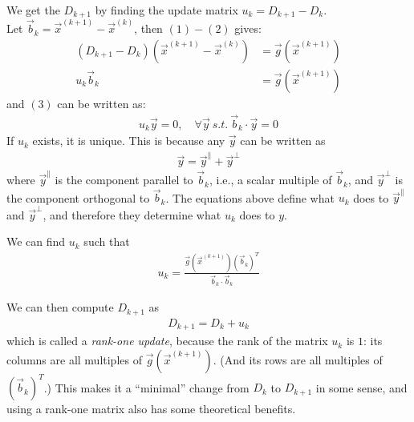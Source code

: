 \documentclass[11pt]{elegantbook}
\begin{document}
We get the $D_{k+1}$ by finding the update matrix $u_k=D_{k+1}-D_k$.\\
Let $\vec{b}_k=\vec{x}^{(k+1)}-\vec{x}^{(k)}$, then $(1) - (2)$ gives:
\begin{equation}
    \begin{aligned}
        (D_{k+1}-D_k)(\vec{x}^{(k+1)}-\vec{x}^{(k)})&=\vec{g}(\vec{x}^{(k+1)})\\
        u_k \vec{b}_k&=\vec{g}(\vec{x}^{(k+1)})
    \end{aligned}
    \nonumber
\end{equation}
and $(3)$ can be written as:
\begin{equation}
    \begin{aligned}
        u_k \vec{y}=0,\quad \forall \vec{y}\ s.t.\ \vec{b}_k\cdot \vec{y}=0
    \end{aligned}
    \nonumber
\end{equation}
If $u_k$ exists, it is unique. This is because any $\vec{y}$ can be written as
\begin{equation}
    \begin{aligned}
        \vec{y}=\vec{y}^{\parallel}+\vec{y}^{\perp}
    \end{aligned}
    \nonumber
\end{equation}
where $\vec{y}^{\parallel}$ is the component parallel to $\vec{b}_k$, i.e., a scalar multiple of $\vec{b}_k$, and $\vec{y}^{\perp}$ is the component orthogonal to $\vec{b}_k$. The equations above define what $u_k$ does to $\vec{y}^{\parallel}$ and $\vec{y}^{\perp}$, and therefore they determine what $u_k$ does to $y$.

We can find $u_k$ such that
\begin{equation}
    \begin{aligned}
        u_k=\frac{\vec{g}(\vec{x}^{(k+1)})(\vec{b}_k)^T}{\vec{b}_k\cdot\vec{b}_k}
    \end{aligned}
    \nonumber
\end{equation}

We can then compute $D_{k+1}$ as
\begin{equation}
    \begin{aligned}
        D_{k+1}=D_k+u_k
    \end{aligned}
    \nonumber
\end{equation}
which is called a \textit{rank-one update}, because the rank of the matrix $u_k$ is $1$: its columns are all multiples of $\vec{g}(\vec{x}^{(k+1)})$. (And its rows are all multiples of $(\vec{b}_k)^T$.) This makes it a “minimal” change from $D_k$ to $D_{k+1}$ in some sense, and using a rank-one matrix also has some theoretical benefits.
\end{document}
